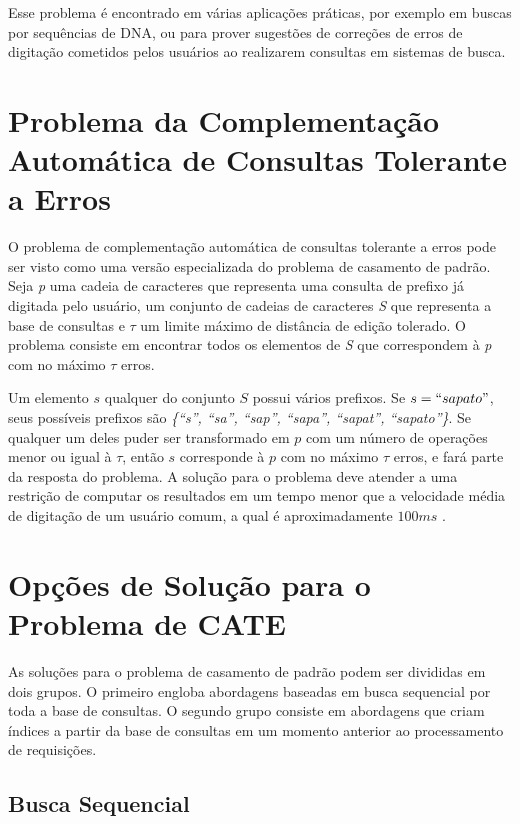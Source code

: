 Esse problema é encontrado em  várias aplicações práticas,  por exemplo em buscas por sequências de DNA, ou para prover sugestões de correções de erros de digitação cometidos pelos usuários ao realizarem consultas em sistemas de busca.

\newpage
\section{Problema da Complementação Automática de Consultas Tolerante a Erros}

O problema de complementação automática de consultas tolerante a erros pode ser visto como uma versão especializada do problema de casamento de padrão. Seja \textit{p} uma cadeia de caracteres que representa uma consulta de prefixo já digitada pelo usuário, um conjunto de cadeias de caracteres \textit{S} que representa a base de consultas e $\tau$ um limite máximo de distância de edição tolerado. O problema consiste em encontrar todos os elementos de \textit{S} que correspondem à \textit{p} com no máximo $\tau$ erros.

Um elemento $s$ qualquer do conjunto $S$ possui vários prefixos. Se $s = ``sapato"$, seus possíveis prefixos são \textit{\{``s'', ``sa'', ``sap'', ``sapa'', ``sapat'', ``sapato''\}}. Se qualquer um deles puder ser transformado em $p$ com um número de operações menor ou igual à $\tau$, então $s$ corresponde à $p$ com no máximo $\tau$ erros, e fará parte da resposta do problema. A solução para o problema deve atender a uma restrição de computar os resultados em um tempo menor que a velocidade média de digitação de um usuário comum, a qual é aproximadamente $100ms$ \citep{ji2009efficient}.

\section{Opções de Solução para o Problema de CATE}

As soluções para o problema de casamento de padrão podem ser divididas em dois grupos. O primeiro engloba abordagens baseadas em busca sequencial por toda a base de consultas. O segundo grupo consiste em abordagens que criam índices a partir da base de consultas em um momento anterior ao processamento de requisições. 

\subsection{Busca Sequencial}
\label{sec:sequential_search}

